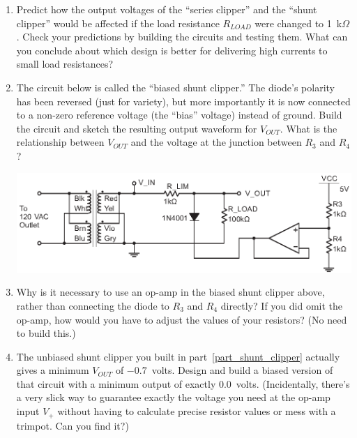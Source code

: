 \begin{enumerate}[wide]
\item Predict how the output voltages of the ``series clipper'' and the ``shunt clipper'' would be affected if the load resistance $R_{LOAD}$  were changed to 1~k$\Omega$.  Check your predictions by building the circuits and testing them. What can you conclude about which design is better for delivering high currents to small load resistances?  

\item The circuit below is called the ``biased shunt clipper.''  The diode's polarity has been reversed (just for variety), but more importantly it is now connected to a non-zero reference voltage (the ``bias'' voltage) instead of ground.  Build the circuit and sketch the resulting output waveform for $V_{OUT}$.  What is the relationship between $V_{OUT}$ and the voltage at the junction between $R_3$ and $R_4$?  
\label{part_biased_shunt_clipper}
\begin{center}
\includegraphics{diodes/biased_shunt_clipper2.eps}
\end{center} 

\item Why is it necessary to use an op-amp in the biased shunt clipper above, rather than connecting the diode to $R_3$ and $R_4$ directly?  If you did omit the op-amp, how would you have to adjust the values of your resistors? (No need to build this.)

\item The unbiased shunt clipper you built in part~\ref{part_shunt_clipper} actually gives a minimum $V_{OUT}$ of $-0.7$~volts.  Design and build a biased version of that circuit with a minimum output of exactly $0.0$~volts.  (Incidentally, there's a very slick way to guarantee exactly the voltage you need at the op-amp input $V_+$ without having to calculate precise resistor values or mess with a trimpot.  Can you find it?)  \label{part_biased_clipper_zero}


\end{enumerate}
